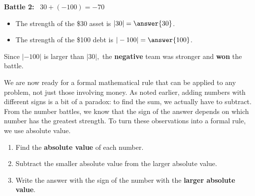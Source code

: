 \documentclass{ximera}[font=12pt]
\begin{document}
\textcolor{accessibleOrange}{\textbf{Battle 2:}} \ $30 + (-100) = -70$
\begin{itemize}
    \item[] The strength of the \$30 asset is $|30| = \answer{30}$.
    \item[] The strength of the \$100 debt is $|-100| = \answer{100}$.
\end{itemize}

Since $|-100|$ is larger than $|30|,$ the \textbf{negative} team was stronger and \textbf{won} the battle.

We are now ready for a formal mathematical rule that can be applied to any problem, not just those involving money.  
As noted earlier, adding numbers with different signs is a bit of a paradox: to find the sum, 
we actually have to subtract.  From the number battles, we know that the sign of the answer depends on which number 
has the greatest strength.  To turn these observations into a formal rule, we use absolute value.


\begin{procedure}

\begin{enumerate} 
    \item Find the \textbf{absolute value} of each number.

     \item Subtract the smaller absolute value from the larger absolute value.

     \item Write the answer with the sign of the number with the \textbf{larger absolute value}.
\end{enumerate}
\end{procedure}
\end{document}
